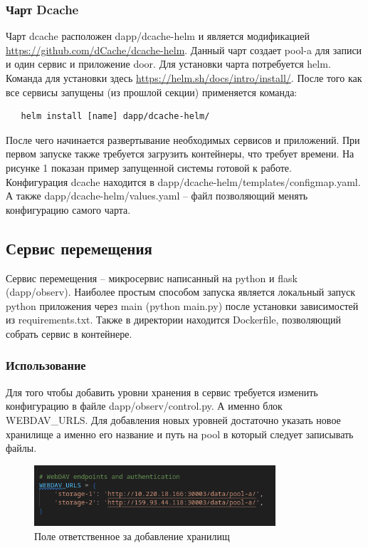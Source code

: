 \documentclass{article}
\begin{document}
\subsubsection{Чарт Dcache}
Чарт dcache расположен dapp/dcache-helm и является модификацией \url{https://github.com/dCache/dcache-helm}. Данный чарт создает pool-a для записи и один сервис и приложение door. 
Для установки чарта потребуется helm. Команда для установки здесь \url{https://helm.sh/docs/intro/install/}. После того как все сервисы запущены (из прошлой секции) применяется команда:
\begin{verbatim}
   helm install [name] dapp/dcache-helm/
\end{verbatim}
После чего начинается развертывание необходимых сервисов и приложений. При первом запуске также требуется загрузить контейнеры, что требует времени. На рисунке 1 показан пример запущенной системы готовой к работе.\\
Конфигурация dcache находится в dapp/dcache-helm/templates/configmap.yaml. А также dapp/dcache-helm/values.yaml -- файл позволяющий менять конфигурацию самого чарта.

\subsection{Сервис перемещения}
Сервис перемещения -- микросервис написанный на python и flask (dapp/observ). Наиболее простым способом запуска является локальный запуск python приложения через main ({\selectfont python main.py}) после установки зависимостей из requirements.txt.
Также в директории находится Dockerfile, позволяющий собрать сервис в контейнере.
\subsubsection{Использование}
Для того чтобы добавить уровни хранения в сервис требуется изменить конфигурацию в файле dapp/observ/control.py. А именно блок WEBDAV\_URLS. Для добавления новых уровней достаточно указать новое хранилище а именно его название и путь на pool в который следует записывать файлы.
\begin{figure}[h]
   \centering
   \includegraphics[width=0.8\textwidth]{images/serv.png}
   \caption{Поле ответственное за добавление хранилищ}
\end{figure}
\end{document}
